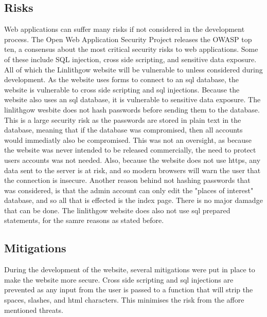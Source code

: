 \documentclass[12pt,a4paper]{article}
\begin{document}
		\subsection{Risks}
		Web applications can suffer many risks if not considered in the development process. The Open Web Application Security Project releases the OWASP top ten, a consensus about the most critical security risks to web applications. Some of these include SQL injection, cross side scripting, and sensitive data exposure. All of which the Linlithgow website will be vulnerable to unless considered during development. As the website uses forms to connect to an sql database, the website is vulnerable to cross side scripting and sql injections. Because the website also uses an sql database, it is vulnerable to sensitive data exposure. The linlithgow wesbite does not hash passwords before sending them to the database. This is a large security risk as the passwords are stored in plain text in the database, meaning that if the database was compromised, then all accounts would immediatly also be compromised. This was not an oversight, as because the website was never intended to be released commercially, the need to protect users accounts was not needed. Also, because the website does not use https, any data sent to the server is at risk, and so modern browsers will warn the user that the connection is insecure. Another reason behind not hashing passwords that was considered, is that the admin account can only edit the "places of interest" database, and so all that is effected is the index page. There is no major damadge that can be done. The linlithgow website does also not use sql prepared statements, for the samre reasons as stated before.

		\subsection{Mitigations}
		During the development of the website, several mitigations were put in place to make the website more secure. Cross side scripting and sql injections are prevented as any input from the user is passed to a function that will strip the spaces, slashes, and html characters. This minimises the risk from the affore mentioned threats.

	\clearpage
\end{document}
